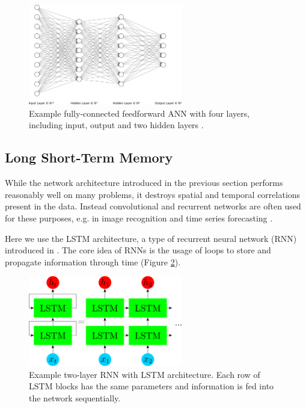 \begin{figure}
	\centering
	\includegraphics[width=0.6\textwidth]{img/nn}
	\caption{Example fully-connected feedforward ANN with four layers, including input, output and two hidden layers \cite{LeNail2019}.}
	\label{nn}
\end{figure}

\subsection{Long Short-Term Memory}
While the network architecture introduced in the previous section performs reasonably well on many problems, it destroys spatial and temporal correlations present in the data. 
Instead convolutional and recurrent networks are often used for these purposes, e.g. in image recognition and time series forecasting \cite{rumelhart1986learning, 10.1007/978-3-642-46466-9_18}.

Here we use the LSTM architecture, a type of recurrent neural network (RNN) introduced in \cite{doi:10.1162/neco.1997.9.8.1735}. 
The core idea of RNNs is the usage of loops to store and propagate information through time (Figure \ref{rnn}).

\begin{figure}
	\centering
	\includegraphics[width=0.6\textwidth]{img/rnn}
	\caption{Example two-layer RNN with LSTM architecture. Each row of LSTM blocks has the same parameters and information is fed into the network sequentially.}
	\label{rnn}
\end{figure}

